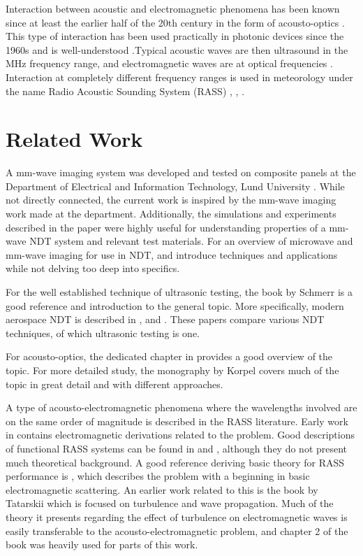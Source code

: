 \documentclass[11pt,twoside]{eitExjobb}
\begin{document}
	Interaction between acoustic and electromagnetic phenomena has been known since at least the earlier half of the 20th century in the form of acousto-optics \cite{Korpel1981}. This type of interaction has been used practically in photonic devices since the 1960s and is well-understood \cite{Korpel1981}.Typical acoustic waves are then ultrasound in the MHz frequency range, and electromagnetic waves are at optical frequencies \cite{Korpel1981}. Interaction at completely different frequency ranges is used in meteorology under the name Radio Acoustic Sounding System (RASS) \cite{Marshall1972}, \cite{May1990}, \cite{Gjessing2001}. 
	
	\section{Related Work}	
	A mm-wave imaging system was developed and tested on composite panels at the Department of Electrical and Information Technology, Lund University \cite{Helander2017}. While not directly connected, the current work is inspired by the mm-wave imaging work made at the department. Additionally, the simulations and experiments described in the paper were highly useful for understanding properties of a mm-wave NDT system and relevant test materials. For an overview of microwave and mm-wave imaging for use in NDT, \cite{Kharkovsky2007} and \cite{Dobmann2012} introduce techniques and applications while not delving too deep into specifics.
	
	For the well established technique of ultrasonic testing, the book by Schmerr \cite{Schmerr2016} is a good reference and introduction to the general topic. More specifically, modern aerospace NDT is described in \cite{Garnier2011}, \cite{Katunin2015} and \cite{Riegert2006}. These papers compare various NDT techniques, of which ultrasonic testing is one.
	
	For acousto-optics, the dedicated chapter in \cite{Saleh2007} provides a good overview of the topic. For more detailed study, the monography by Korpel \cite{Korpel1988} covers much of the topic in great detail and with different approaches.
	
	A type of acousto-electromagnetic phenomena where the wavelengths involved are on the same order of magnitude is described in the RASS literature. Early work in \cite{Tonning1957} contains electromagnetic derivations related to the problem. Good descriptions of functional RASS systems can be found in \cite{Marshall1972} and \cite{May1990}, although they do not present much theoretical background. A good reference deriving basic theory for RASS performance is \cite{Gurvich1987}, which describes the problem with a beginning in basic electromagnetic scattering. An earlier work related to this is the book by Tatarskii \cite{Tatarskii1971} which is focused on turbulence and wave propagation. Much of the theory it presents regarding the effect of turbulence on electromagnetic waves is easily transferable to the acousto-electromagnetic problem, and chapter 2 of the book was heavily used for parts of this work.
	
\end{document}
